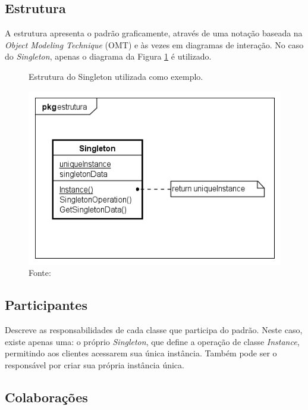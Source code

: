 \subsection*{Estrutura}

A estrutura apresenta o padrão graficamente, através de uma 
notação baseada na \textit{Object Modeling Technique} (OMT) 
e às vezes em diagramas de interação. No caso do \textit{Singleton}, 
apenas o diagrama da Figura \ref{fig_grafico} é utilizado.

\begin{figure}[htb]
	\caption{\label{fig_grafico}Estrutura do Singleton utilizada como exemplo.}
    \begin{center}
	    \includegraphics[scale=0.6]{5_padroes-contexto-funcional/5.1_criacionais/5.1.5_singleton/singleton_estrutura.png}
    \end{center}
    \caption*{Fonte: \cite{gamma:1995}}
\end{figure}

\subsection*{Participantes}

Descreve as responsabilidades de cada classe que 
participa do padrão. Neste caso, existe 
apenas uma: o próprio \textit{Singleton}, que define 
a operação de classe \textit{Instance}, permitindo aos clientes 
acessarem sua única instância. Também pode ser o 
responsável por criar sua própria instância única.

\subsection*{Colaborações}

